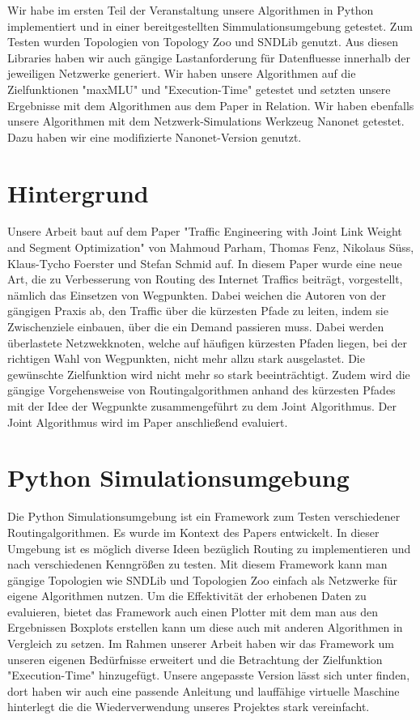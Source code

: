 \documentclass[sigconf,noacm,review]{acmart}
\begin{document}
Wir habe im ersten Teil der Veranstaltung unsere Algorithmen in Python implementiert und in einer bereitgestellten Simmulationsumgebung \cite{python-simmulation} getestet.
Zum Testen wurden Topologien von Topology Zoo \cite{topology-zoo} und SNDLib \cite{SNDlib10} genutzt.
Aus diesen Libraries haben wir auch gängige Lastanforderung für Datenfluesse innerhalb der jeweiligen Netzwerke generiert. 
Wir haben unsere Algorithmen auf die Zielfunktionen "maxMLU" und "Execution-Time" getestet und setzten unsere Ergebnisse mit dem Algorithmen aus dem Paper \cite{10.1145/3485983.3494846} in Relation.
Wir haben ebenfalls unsere Algorithmen mit dem Netzwerk-Simulations Werkzeug Nanonet \cite{original-nanonet} getestet. Dazu haben wir eine modifizierte Nanonet-Version \cite{nikolaussuess-nanonet} genutzt. 

\section{Hintergrund}
Unsere Arbeit baut auf dem Paper "Traffic Engineering with
Joint Link Weight and Segment Optimization" \cite{10.1145/3485983.3494846} von Mahmoud Parham, Thomas Fenz, Nikolaus Süss, Klaus-Tycho Foerster und Stefan Schmid auf. In diesem Paper wurde eine neue Art, die zu Verbesserung von Routing des Internet Traffics beiträgt, vorgestellt, nämlich das Einsetzen von Wegpunkten. Dabei weichen die Autoren von der gängigen Praxis ab, den Traffic über die kürzesten Pfade zu leiten, indem sie Zwischenziele einbauen, über die ein Demand passieren muss. Dabei werden überlastete Netzwekknoten, welche auf häufigen kürzesten Pfaden liegen, bei der richtigen Wahl von Wegpunkten, nicht mehr allzu stark ausgelastet. Die gewünschte Zielfunktion wird nicht mehr so stark beeinträchtigt. Zudem wird die gängige Vorgehensweise von Routingalgorithmen anhand des kürzesten Pfades mit der Idee der Wegpunkte zusammengeführt zu dem Joint Algorithmus. Der Joint Algorithmus wird im Paper anschließend evaluiert.

\section{Python Simulationsumgebung}
Die Python Simulationsumgebung ist ein Framework zum Testen verschiedener Routingalgorithmen. Es wurde im Kontext des Papers \cite{10.1145/3485983.3494846} entwickelt. In dieser Umgebung ist es möglich diverse Ideen bezüglich Routing zu implementieren und nach verschiedenen Kenngrößen zu testen. Mit diesem Framework kann man gängige  Topologien wie SNDLib \cite{SNDlib10} und Topologien Zoo \cite{topology-zoo} einfach als Netzwerke für eigene Algorithmen nutzen. Um die Effektivität der erhobenen Daten zu evaluieren, bietet das Framework auch einen Plotter mit dem man aus den Ergebnissen Boxplots erstellen kann um diese auch mit anderen Algorithmen in Vergleich zu setzen. Im Rahmen unserer Arbeit haben wir das Framework um unseren eigenen Bedürfnisse erweitert und die Betrachtung der Zielfunktion "Execution-Time" hinzugefügt. Unsere angepasste Version lässt sich unter \cite{repository-project1} finden, dort haben wir auch eine passende Anleitung und lauffähige virtuelle Maschine hinterlegt die die Wiederverwendung unseres Projektes stark vereinfacht.
\end{document}
